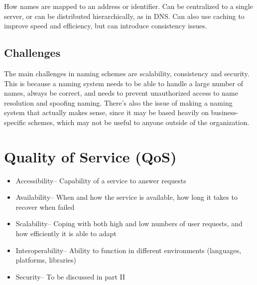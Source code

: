 How names are mapped to an address or identifier. Can be centralized to a single server, or can be distributed hierarchically, as in DNS. Can also use caching to improve speed and efficiency, but can introduce consistency issues.

\subsection*{Challenges}

The main challenges in naming schemes are scalability, consistency and security. This is because a naming system needs to be able to handle a large number of names, always be correct, and needs to prevent unauthorized access to name resolution and spoofing naming. There's also the issue of making a naming system that actually makes sense, since it may be based heavily on business-specific schemes, which may not be useful to anyone outside of the organization.

\section*{Quality of Service (QoS)}

\begin{itemize}
  \item Accessibility-- Capability of a service to answer requests
  \item Availability-- When and how the service is available, how long it takes to recover when failed
  \item Scalability-- Coping with both high and low numbers of user requests, and how efficiently it is able to adapt
  \item Interoperability-- Ability to function in different environments (languages, platforms, libraries)
  \item Security-- To be discussed in part II
\end{itemize}